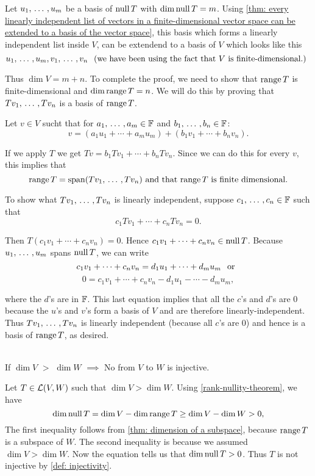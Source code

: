 \begin{prf}
  Let $u_1, {\, \ldots \,\,}, u_m$ be a basis of $\operatorname{null} T$ with $\dim \operatorname{null} T = m$. Using \ref{thm: every linearly independent list of vectors in a finite-dimensional vector space can be extended to a basis of the vector space}, this basis which forms a linearly independent list inside $V$, can be extendend to a basis of $V$ which looks like this
  \[
    u_1, {\, \ldots \,\,}, u_m, v_1, {\, \ldots \,\,}, v_n \;\;\, \text{(we have been using the fact that $V$ is finite-dimensional.)}\;\;
  \]

  Thus $\dim V = m+n$. To complete the proof, we need to show that $\operatorname{range} T$ is finite-dimensional and $\dim \operatorname{range} T = n$. We will do this by proving that $Tv_1, {\, \ldots \,\,}, Tv_n$ is a basis of $\operatorname{range} T$.

  Let $v \in V$ sucht that for $a_1, {\, \ldots \,\,}, a_m \in \mathbb{F}$ and $b_1, {\, \ldots \,\,}, b_n \in \mathbb{F}$:
  \[
    v= (a_1 u_1 + \cdots + a_m  u_m) + (b_1 v_1 + \cdots + b_n v_n).
  \]

  If we apply $T$ we get $Tv=b_1Tv_1+ \cdots + b_nTv_n$. Since we can do this for every $v$, this implies that
  \[
    \myrange T = \myspan{Tv_1, \ddd, Tv_n} $ and that $\myrange T$ is finite dimensional.$
  \]

   To show what $Tv_1, {\, \ldots \,\,}, Tv_n$ is linearly independent, suppose $c_1, {\, \ldots \,\,}, c_n \in \mathbb{F}$ such that
  \[
    c_1 Tv_1 + \cdots + c_n T v_n = 0.
  \]

  Then $T(c_1 v_1 + \cdots + c_n v_n) = 0.$ Hence $c_1 v_1 + \cdots + c_n v_n \in \operatorname{null} T$. Because $u_1, {\, \ldots \,\,}, u_m$ spans $\operatorname{null} T$, we can write
  \[
    c_1 v_1 + \cdots + c_n v_n = d_1 u_1 + \cdots +  d_m u_m \;\;\, \text{or}\;\;
  \]
  \[
  0 = c_1 v_1 + \cdots + c_n v_n - d_1 u_1 - \cdots - d_m u_m,
  \]

  where the $d$'s are in $\mathbb{F}$. This last equation implies that all the $c$'s and $d$'s are $0$ because the $u$'s and $v$'s form a basis of $V$ and are therefore linearly-independent. Thus $Tv_1, {\, \ldots \,\,}, Tv_n$ is linearly independent (because all $c$'s are $0$) and hence is a basis of $\operatorname{range} T$, as desired.
\end{prf}


  \setcounter{thm}{21}
  \begin{thm} 
    \label{thm: linear-map-to-a-lower-dimensional-space-is-not-injective}
    \phantom{.}\\
    If $\dim V$ $>$ $\dim W$
    $\implies$ No \lm from $V$ to $W$ is injective.
  \end{thm}
  \begin{prf} Let $T\in \mathcal{L}(V,W)$ such that $\dim V > \dim W$. Using \ref{rank-nullity-theorem}, we have
    \begin{equation}
      \dim \operatorname{null} T = \dim V - \dim \operatorname{range} T \geq \dim V - \dim W > 0,
    \end{equation}
    The first inequality follows from \ref{thm: dimension of a subspace}, because $\operatorname{range} T$ is a subspace of $W$. The second inequality is because we assumed $\dim V > \dim W$. Now the equation tells us that $\dim \operatorname{null} T > 0$. Thus $T$ is not injective by \ref{def: injectivity}.
  \end{prf}

